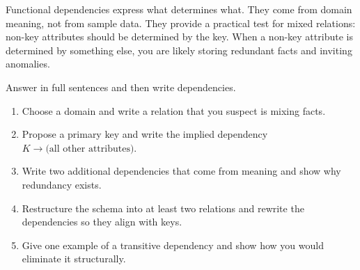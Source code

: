 \begin{chaptersummary}
Functional dependencies express what determines what.
They come from domain meaning, not from sample data.
They provide a practical test for mixed relations: non-key attributes should be determined by the key.
When a non-key attribute is determined by something else, you are likely storing redundant facts and inviting anomalies.
\end{chaptersummary}

\begin{exercisebox}
Answer in full sentences and then write dependencies.
\begin{enumerate}[label=\arabic*.]
  \item Choose a domain and write a relation that you suspect is mixing facts.
  \item Propose a primary key and write the implied dependency \(K \rightarrow \text{(all other attributes)}\).
  \item Write two additional dependencies that come from meaning and show why redundancy exists.
  \item Restructure the schema into at least two relations and rewrite the dependencies so they align with keys.
  \item Give one example of a transitive dependency and show how you would eliminate it structurally.
\end{enumerate}
\end{exercisebox}
